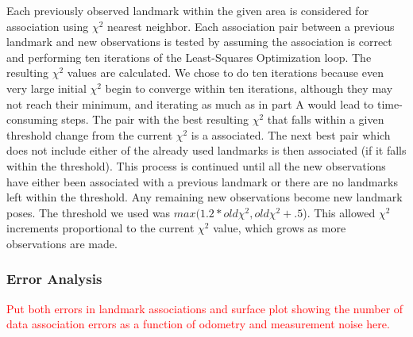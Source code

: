 \documentclass[12pt]{article}
\begin{document}
Each previously observed landmark within the given area is considered for association using $\chi^2$ nearest neighbor.  Each association pair between a previous landmark and new observations is tested by assuming the association is correct and performing ten iterations of the Least-Squares Optimization loop.  The resulting $\chi^2$ values are calculated.  We chose to do ten iterations because even very large initial $\chi^2$ begin to converge within ten iterations, although they may not reach their minimum, and iterating as much as in part A would lead to time-consuming steps.  The pair with the best resulting $\chi^2$ that falls within a given threshold change from the current $\chi^2$ is a associated.  The next best pair which does not include either of the already used landmarks is then associated (if it falls within the threshold).  This process is continued until all the new observations have either been associated with a previous landmark or there are no landmarks left within the threshold.  Any remaining new observations become new landmark poses.  The threshold we used was $max(1.2*old\chi^2, old\chi^2 + .5$).  This allowed $\chi^2$ increments proportional to the current $\chi^2$ value, which grows as more observations are made.


\subsubsection*{Error Analysis}

\textcolor{red}{Put both errors in landmark associations and surface plot showing the number of data association errors as a function of odometry and measurement noise here.}
\end{document}
